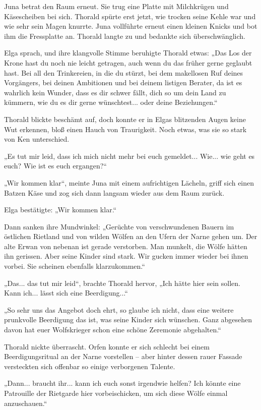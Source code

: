 Juna betrat den Raum erneut. Sie trug eine Platte mit Milchkrügen und Käsescheiben bei sich. Thorald spürte erst jetzt, wie trocken seine Kehle war und wie sehr sein Magen knurrte. Juna vollführte erneut einen kleinen Knicks und bot ihm die Fressplatte an. Thorald langte zu und bedankte sich überschwänglich.

Elga sprach, und ihre klangvolle Stimme beruhigte Thorald etwas: „Das Los der Krone hast du noch nie leicht getragen, auch wenn du das früher gerne geglaubt hast. Bei all den Trinkereien, in die du stürzt, bei dem makellosen Ruf deines Vorgängers, bei deinen Ambitionen und bei deinem listigen Berater, da ist es wahrlich kein Wunder, dass es dir schwer fällt, dich so um dein Land zu kümmern, wie du es dir gerne wünschtest... oder deine Beziehungen.“

Thorald blickte beschämt auf, doch konnte er in Elgas blitzenden Augen keine Wut erkennen, bloß einen Hauch von Traurigkeit. Noch etwas, was sie so stark von Ken unterschied.

„Es tut mir leid, dass ich mich nicht mehr bei euch gemeldet... Wie... wie geht es euch? Wie ist es euch ergangen?“

„Wir kommen klar“, meinte Juna mit einem aufrichtigen Lächeln, griff sich einen Batzen Käse und zog sich dann langsam wieder aus dem Raum zurück.

Elga bestätigte: „Wir kommen klar.“

Dann sanken ihre Mundwinkel: „Gerüchte von verschwundenen Bauern im östlichen Rietland und von wilden Wölfen an den Ufern der Narne gehen um. Der alte Erwan von nebenan ist gerade verstorben. Man munkelt, die Wölfe hätten ihn gerissen. Aber seine Kinder sind stark. Wir gucken immer wieder bei ihnen vorbei. Sie scheinen ebenfalls klarzukommen.“

„Das... das tut mir leid“, brachte Thorald hervor, „Ich hätte hier sein sollen. Kann ich... lässt sich eine Beerdigung...“

„So sehr uns das Angebot doch ehrt, so glaube ich nicht, dass eine weitere prunkvolle Beerdigung das ist, was seine Kinder sich wünschen. Ganz abgesehen davon hat euer Wolfskrieger schon eine schöne Zeremonie abgehalten.“

Thorald nickte überrascht. Orfen konnte er sich schlecht bei einem Beerdigungsritual an der Narne vorstellen – aber hinter dessen rauer Fassade versteckten sich offenbar so einige verborgenen Talente.

„Dann... braucht ihr... kann ich euch sonst irgendwie helfen? Ich könnte eine Patrouille der Rietgarde hier vorbeischicken, um sich diese Wölfe einmal anzuschauen.“

